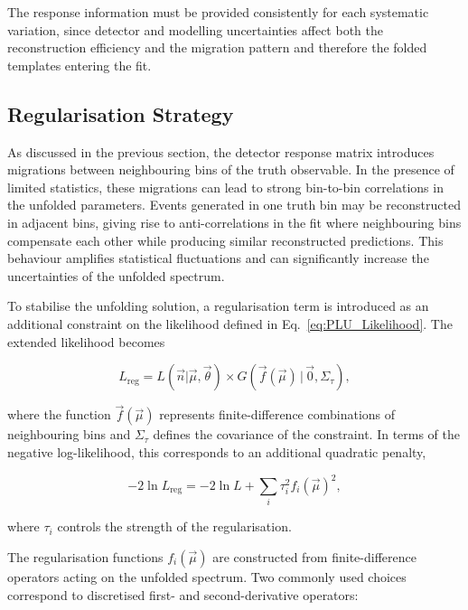 The response information must be provided consistently for each systematic variation, since detector and modelling uncertainties affect both the reconstruction efficiency and the migration pattern and therefore the folded templates entering the fit.

\subsection{Regularisation Strategy}
\label{sec:regularisation}

As discussed in the previous section, the detector response matrix introduces migrations between neighbouring bins of the truth observable. 
In the presence of limited statistics, these migrations can lead to strong bin-to-bin correlations in the unfolded parameters. 
Events generated in one truth bin may be reconstructed in adjacent bins, giving rise to anti-correlations in the fit where neighbouring bins compensate each other while producing similar reconstructed predictions. 
This behaviour amplifies statistical fluctuations and can significantly increase the uncertainties of the unfolded spectrum.

To stabilise the unfolding solution, a regularisation term is introduced as an additional constraint on the likelihood defined in Eq.~\ref{eq:PLU_Likelihood}. 
The extended likelihood becomes

\begin{equation}
L_{\mathrm{reg}}
=
L(\vec{n}|\vec{\mu},\vec{\theta})
\times
G(\vec f(\vec{\mu})\,|\,\vec 0,\Sigma_\tau),
\end{equation}

where the function $\vec f(\vec{\mu})$ represents finite-difference combinations of neighbouring bins and $\Sigma_\tau$ defines the covariance of the constraint. 
In terms of the negative log-likelihood, this corresponds to an additional quadratic penalty,

\begin{equation}
-2\ln L_{\mathrm{reg}}
=
-2\ln L
+
\sum_i \tau_i^2 f_i(\vec{\mu})^2 ,
\end{equation}

where $\tau_i$ controls the strength of the regularisation.

The regularisation functions $f_i(\vec{\mu})$ are constructed from finite-difference operators acting on the unfolded spectrum. 
Two commonly used choices correspond to discretised first- and second-derivative operators:

